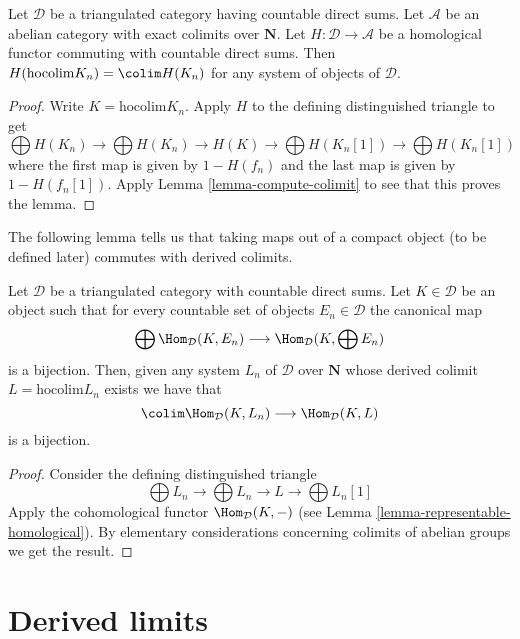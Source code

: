 \begin{lemma}
\label{lemma-cohomology-of-hocolim}
Let $\mathcal{D}$ be a triangulated category having countable
direct sums. Let $\mathcal{A}$ be an abelian category with exact
colimits over $\mathbf{N}$.
Let $H : \mathcal{D} \to \mathcal{A}$ be a homological functor
commuting with countable direct sums.
Then $H(\text{hocolim} K_n) = \colim H(K_n)$
for any system of objects of $\mathcal{D}$.
\end{lemma}

\begin{proof}
Write $K = \text{hocolim} K_n$. Apply $H$ to the defining
distinguished triangle to get
$$
\bigoplus H(K_n) \to \bigoplus H(K_n)
\to H(K) \to
\bigoplus H(K_n[1]) \to \bigoplus H(K_n[1])
$$
where the first map is given by $1 - H(f_n)$ and the last map
is given by $1 - H(f_n[1])$.
Apply Lemma \ref{lemma-compute-colimit} to see that this proves the lemma.
\end{proof}

\noindent
The following lemma tells us that taking maps out of a compact
object (to be defined later) commutes with derived colimits.

\begin{lemma}
\label{lemma-commutes-with-countable-sums}
Let $\mathcal{D}$ be a triangulated category with countable direct sums.
Let $K \in \mathcal{D}$ be an object such that for every
countable set of objects $E_n \in \mathcal{D}$ the canonical map
$$
\bigoplus \Hom_\mathcal{D}(K, E_n)
\longrightarrow
\Hom_\mathcal{D}(K, \bigoplus E_n)
$$
is a bijection. Then, given any system $L_n$ of $\mathcal{D}$ over
$\mathbf{N}$ whose derived colimit $L = \text{hocolim} L_n$
exists we have that
$$
\colim \Hom_\mathcal{D}(K, L_n) \longrightarrow \Hom_\mathcal{D}(K, L)
$$
is a bijection.
\end{lemma}

\begin{proof}
Consider the defining distinguished triangle
$$
\bigoplus L_n \to \bigoplus L_n \to L \to \bigoplus L_n[1]
$$
Apply the cohomological functor $\Hom_\mathcal{D}(K, -)$
(see Lemma \ref{lemma-representable-homological}).
By elementary considerations concerning colimits of abelian groups
we get the result.
\end{proof}






\section{Derived limits}
\label{section-derived-limit}

